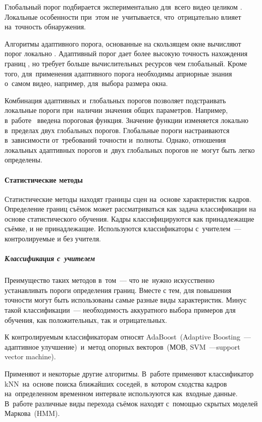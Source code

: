 Глобальный порог подбирается экспериментально
для~всего видео целиком \cite{Cernekova:2006}.
Локальные особенности при~этом не~учитывается,
что~отрицательно влияет на~точность обнаружения.

Алгоритмы адаптивного порога,
основанные на скользящем окне вычисляют порог локально
\cite{Hoi:2006} \cite{Wu:2008}.
Адаптивный порог дает более высокую точность
нахождения границ \cite{Hanjalic:2002}, но требует больше
вычислительных ресурсов чем глобальный.
Кроме того, для~применения адаптивного порога необходимы априорные знания
о~самом видео, например, для~выбора размера окна.

Комбинация адаптивных и~глобальных порогов позволяет
подстраивать локальные пороги при~наличии значения общих параметров.
Например, в~работе~\cite{Quenot:2003} введена пороговая функция.
Значение функции изменяется локально в~пределах двух глобальных порогов.
Глобальные пороги настраиваются в~зависимости
от~требований точности и~полноты.
Однако, отношения локальных адаптивных порогов
и~двух глобальных порогов не~могут быть легко определены.

\paragraph{Статистические методы}

Статистические методы находят границы сцен на~основе характеристик кадров.
Определение границ съёмок может рассматриваться как задача классификации
на основе статистического обучения. Кадры классифицируются
как принадлежащие съёмке, и не принадлежащие.
Используются классификаторы с~учителем~— контролируемые и без учителя.

\subparagraph{Классификация  с~учителем}

Преимущество таких методов в~том~— что
не~нужно искусственно устанавливать пороги определения границ.
Вместе с тем, для повышения точности могут быть использованы
самые разные виды характеристик.
Минус такой классификации~— необходимость аккуратного
выбора примеров для обучения,
как положительных, так и отрицательных.

К контролируемым классификаторам относят AdaBoost\ (Adaptive
Boosting~—адаптивное улучшение)\ и~метод
опорных векторов\ (МОВ,
SVM~—support vector machine).

Применяют и некоторые другие алгоритмы.
В~работе  \cite{Cooper:2007} применяют классификатор
kNN\ на~основе поиска ближайших соседей,
в~котором сходства кадров на~определенном временном интервале используются
как~входные данные.
В~работе \cite{Boreczky:1998} различные виды перехода съёмок находят
с~помощью скрытых моделей Маркова\ (HMM).

